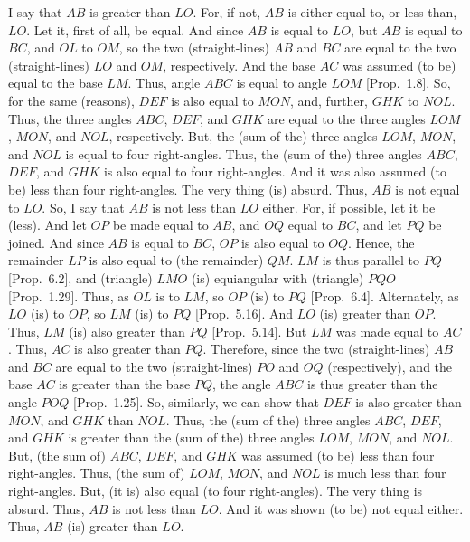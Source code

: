 \begin{Parallel}{}{}
{
\centerline{}

 I say that $AB$ is greater
than $LO$. For, if not, $AB$ is either equal to, or less than, $LO$.
Let it, first of all, be equal. And since $AB$ is equal to $LO$, but $AB$
is equal to $BC$, and $OL$ to $OM$, so the two (straight-lines)
$AB$ and $BC$ are equal to the two (straight-lines) $LO$ and $OM$, respectively. And the base $AC$ was assumed (to be) equal to the base
$LM$. Thus, angle $ABC$ is equal to angle $LOM$ [Prop.~1.8]. So, for the same (reasons), $DEF$ is also equal to $MON$,
and, further, $GHK$ to $NOL$. Thus, the three angles $ABC$, $DEF$,
and $GHK$ are equal to the three angles $LOM$, $MON$, and $NOL$,
respectively. But, the (sum of the) three angles $LOM$, $MON$,
and $NOL$ is equal to four right-angles. 
Thus, the (sum of the) three angles $ABC$, $DEF$, and $GHK$ is
also equal to four right-angles.
And it was also assumed (to be)
less than four right-angles. The very thing (is) absurd. Thus, $AB$
is not equal to $LO$. So, I say that $AB$ is not less than $LO$ either.
For, if possible, let it be (less). And let $OP$ be made equal to $AB$, and
$OQ$ equal to $BC$, and let $PQ$ be joined. And since $AB$ is equal
to $BC$, $OP$ is also equal to $OQ$. Hence, the remainder $LP$ is also
equal to (the remainder) $QM$. $LM$ is thus parallel to $PQ$ [Prop.~6.2], and (triangle) $LMO$ (is) equiangular with (triangle) $PQO$
[Prop.~1.29]. 
Thus, as $OL$ is to $LM$, so $OP$ (is) to $PQ$ [Prop.~6.4]. Alternately, as $LO$ (is) to $OP$, so $LM$ (is) to $PQ$
[Prop.~5.16]. And $LO$ (is) greater than $OP$. 
Thus, $LM$ (is) also greater than $PQ$ [Prop.~5.14]. 
But $LM$ was made equal to $AC$. Thus, $AC$ is also greater than $PQ$. Therefore, since the two
(straight-lines) $AB$ and $BC$ are equal
to the two (straight-lines) $PO$ and $OQ$ (respectively), and the base $AC$ is greater
than the base $PQ$, the angle $ABC$ is thus greater than the
angle $POQ$ [Prop.~1.25]. So, similarly,
we can show that $DEF$ is also greater than $MON$, and $GHK$ than
$NOL$. Thus, the (sum of the) three angles $ABC$, $DEF$, and
$GHK$ is greater than the (sum of the) three angles $LOM$, $MON$, and
$NOL$. But, (the sum of) $ABC$, $DEF$, and $GHK$ was assumed (to be)
less than four right-angles. Thus, (the sum of) $LOM$, $MON$, and
$NOL$ is much less than four right-angles. But, (it is) also equal (to four right-angles). The very thing is absurd. Thus, $AB$ is not less than $LO$.
And it was shown (to be) not equal either. Thus, $AB$ (is) greater  than
$LO$.

}
\end{Parallel}
